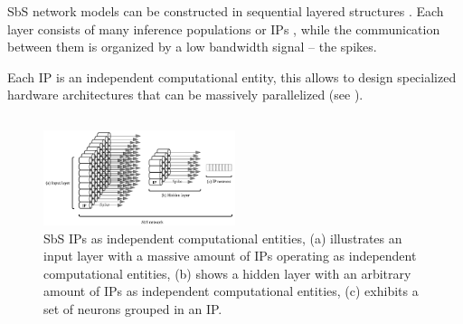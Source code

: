 SbS network models can be constructed in sequential layered structures \cite{rotermund2019Backpropagation}. Each layer consists of many inference populations or IPs , while the communication between them is organized by a low bandwidth signal -- the spikes.

 Each IP is an independent computational entity, this allows to design specialized hardware architectures that can be massively parallelized (see ).

\subsection{}



\begin{figure}
	\centering
	\includegraphics[width=0.5\textwidth]{../figures/SbS_layer.pdf}
	\caption{SbS IPs as independent computational entities, (a) illustrates an input layer with a massive amount of IPs operating as independent computational entities, (b) shows a hidden layer with an arbitrary amount of IPs as independent computational entities, (c) exhibits a set of neurons grouped in an IP.}
	\label{fig:SbS_layer}
\end{figure}



